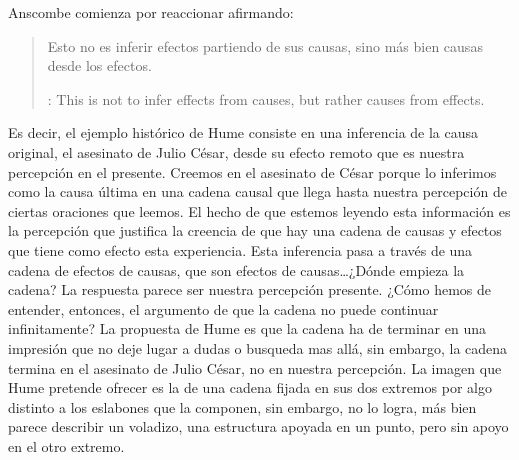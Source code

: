 Anscombe comienza por reaccionar afirmando: \blockquote[{\cite[86]{anscombe1981parmenides:humeandjulius}}: This is not to infer effects from causes, but rather causes from effects.]{Esto no es inferir efectos partiendo de sus causas, sino más bien causas desde los efectos.} Es decir, el ejemplo histórico de Hume consiste en una inferencia de la causa original, el asesinato de Julio César, desde su efecto remoto que es nuestra percepción en el presente. Creemos en el asesinato de César porque lo inferimos como la causa última en una cadena causal que llega hasta nuestra percepción de ciertas oraciones que leemos. El hecho de que estemos leyendo esta información es la percepción que justifica la creencia de que hay una cadena de causas y efectos que tiene como efecto esta experiencia. Esta inferencia pasa a través de una cadena de efectos de causas, que son efectos de causas\ldots ¿Dónde empieza la cadena? La respuesta parece ser nuestra percepción presente. ¿Cómo hemos de entender, entonces, el argumento de que la cadena no puede continuar infinitamente? La propuesta de Hume es que la cadena ha de terminar en una impresión que no deje lugar a dudas o busqueda mas allá, sin embargo, la cadena termina en el asesinato de Julio César, no en nuestra percepción. La imagen que Hume pretende ofrecer es la de una cadena fijada en sus dos extremos por algo distinto a los eslabones que la componen, sin embargo, no lo logra, más bien parece describir un voladizo, una estructura apoyada en un punto, pero sin apoyo en el otro extremo.

